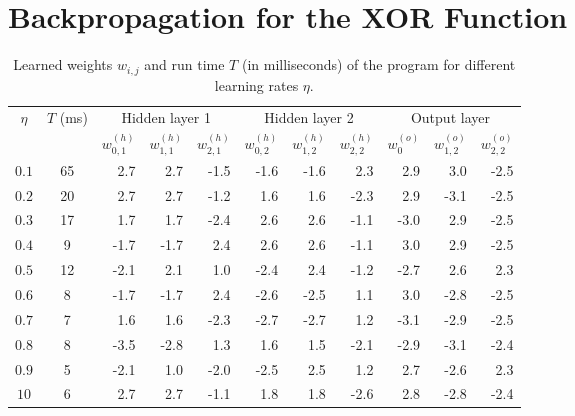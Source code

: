 \section{Backpropagation for the XOR Function}

\begin{table}[h]
\begin{centering}
\caption{Learned weights $w_{i,j}$ and run time $T$ (in milliseconds) of
the program for different learning rates $\eta$.\label{tab:table}}

\par\end{centering}

\centering{}%
\begin{tabular}{ccrrrrrrrrr}
\toprule 
\multirow{2}{*}{$\eta$} & \multirow{2}{*}{$T$ (ms)} & \multicolumn{3}{c}{Hidden layer 1 } & \multicolumn{3}{c}{Hidden layer 2} & \multicolumn{3}{c}{Output layer}\tabularnewline
\cmidrule{3-11} 
 &  & $w_{0,1}^{(h)}$ & $w_{1,1}^{(h)}$ & $w_{2,1}^{(h)}$ & $w_{0,2}^{(h)}$ & $w_{1,2}^{(h)}$ & $w_{2,2}^{(h)}$ & $w_{0}^{(o)}$ & $w_{1,2}^{(o)}$ & $w_{2,2}^{(o)}$\tabularnewline
\midrule
$0.1$ & 65 & 2.7 & 2.7 & -1.5 & -1.6 & -1.6 & 2.3 & 2.9 & 3.0 & -2.5\tabularnewline
$0.2$ & 20 & 2.7 & 2.7 & -1.2 & 1.6 & 1.6 & -2.3 & 2.9 & -3.1 & -2.5\tabularnewline
$0.3$ & 17 & 1.7 & 1.7 & -2.4 & 2.6 & 2.6 & -1.1 & -3.0 & 2.9 & -2.5\tabularnewline
$0.4$ & 9 & -1.7 & -1.7 & 2.4 & 2.6 & 2.6 & -1.1 & 3.0 & 2.9 & -2.5\tabularnewline
$0.5$ & 12 & -2.1 & 2.1 & 1.0 & -2.4 & 2.4 & -1.2 & -2.7 & 2.6 & 2.3\tabularnewline
$0.6$ & 8 & -1.7 & -1.7 & 2.4 & -2.6 & -2.5 & 1.1 & 3.0 & -2.8 & -2.5\tabularnewline
$0.7$ & 7 & 1.6 & 1.6 & -2.3 & -2.7 & -2.7 & 1.2 & -3.1 & -2.9 & -2.5\tabularnewline
$0.8$ & 8 & -3.5 & -2.8 & 1.3 & 1.6 & 1.5 & -2.1 & -2.9 & -3.1 & -2.4\tabularnewline
$0.9$ & 5 & -2.1 & 1.0 & -2.0 & -2.5 & 2.5 & 1.2 & 2.7 & -2.6 & 2.3\tabularnewline
$10$ & 6 & 2.7 & 2.7 & -1.1 & 1.8 & 1.8 & -2.6 & 2.8 & -2.8 & -2.4\tabularnewline
\bottomrule
\end{tabular}
\end{table}

